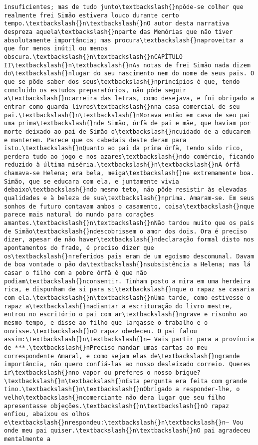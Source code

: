 \begin{Verbatim}[commandchars=\\\{\}]
insuficientes; mas de tudo junto\textbackslash{}npôde-se colher que realmente frei Simão estivera louco durante certo tempo.\textbackslash{}n\textbackslash{}nO autor desta narrativa despreza aquela\textbackslash{}nparte das Memórias que não tiver absolutamente importância; mas procura\textbackslash{}naproveitar a que for menos inútil ou menos obscura.\textbackslash{}n\textbackslash{}nCAPÍTULO II\textbackslash{}n\textbackslash{}nAs notas de frei Simão nada dizem do\textbackslash{}nlugar do seu nascimento nem do nome de seus pais. O que se pôde saber dos seus\textbackslash{}nprincípios é que, tendo concluído os estudos preparatórios, não pôde seguir a\textbackslash{}ncarreira das letras, como desejava, e foi obrigado a entrar como guarda-livros\textbackslash{}nna casa comercial de seu pai.\textbackslash{}n\textbackslash{}nMorava então em casa de seu pai uma prima\textbackslash{}nde Simão, órfã de pai e mãe, que haviam por morte deixado ao pai de Simão o\textbackslash{}ncuidado de a educarem e manterem. Parece que os cabedais deste deram para isto.\textbackslash{}nQuanto ao pai da prima órfã, tendo sido rico, perdera tudo ao jogo e nos azares\textbackslash{}ndo comércio, ficando reduzido à última miséria.\textbackslash{}n\textbackslash{}nA órfã chamava-se Helena; era bela, meiga\textbackslash{}ne extremamente boa. Simão, que se educara com ela, e juntamente vivia debaixo\textbackslash{}ndo mesmo teto, não pôde resistir às elevadas qualidades e à beleza de sua\textbackslash{}nprima. Amaram-se. Em seus sonhos de futuro contavam ambos o casamento, coisa\textbackslash{}nque parece mais natural do mundo para corações amantes.\textbackslash{}n\textbackslash{}nNão tardou muito que os pais de Simão\textbackslash{}ndescobrissem o amor dos dois. Ora é preciso dizer, apesar de não haver\textbackslash{}ndeclaração formal disto nos apontamentos do frade, é preciso dizer que os\textbackslash{}nreferidos pais eram de um egoísmo descomunal. Davam de boa vontade o pão da\textbackslash{}nsubsistência a Helena; mas lá casar o filho com a pobre órfã é que não podiam\textbackslash{}nconsentir. Tinham posto a mira em uma herdeira rica, e dispunham de si para si\textbackslash{}nque o rapaz se casaria com ela.\textbackslash{}n\textbackslash{}nUma tarde, como estivesse o rapaz a\textbackslash{}nadiantar a escrituração do livro mestre, entrou no escritório o pai com ar\textbackslash{}ngrave e risonho ao mesmo tempo, e disse ao filho que largasse o trabalho e o ouvisse.\textbackslash{}nO rapaz obedeceu. O pai falou assim:\textbackslash{}n\textbackslash{}n— Vais partir para a província de ***.\textbackslash{}nPreciso mandar umas cartas ao meu correspondente Amaral, e como sejam elas de\textbackslash{}ngrande importância, não quero confiá-las ao nosso desleixado correio. Queres ir\textbackslash{}nno vapor ou preferes o nosso brigue?\textbackslash{}n\textbackslash{}nEsta pergunta era feita com grande tino.\textbackslash{}n\textbackslash{}nObrigado a responder-lhe, o velho\textbackslash{}ncomerciante não dera lugar que seu filho apresentasse objeções.\textbackslash{}n\textbackslash{}nO rapaz enfiou, abaixou os olhos e\textbackslash{}nrespondeu:\textbackslash{}n\textbackslash{}n— Vou onde meu pai quiser.\textbackslash{}n\textbackslash{}nO pai agradeceu mentalmente a 
\end{Verbatim}
